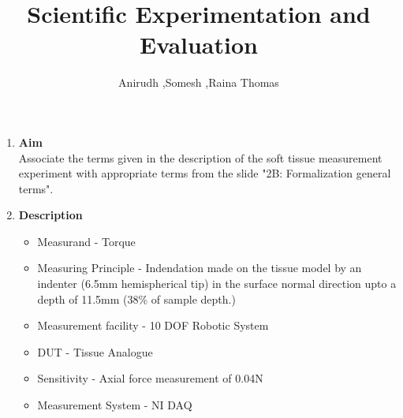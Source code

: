 \documentclass[10pt,a4paper]{article}
\author{Anirudh ,Somesh ,Raina Thomas}
\title{
	\textbf{Scientific Experimentation and Evaluation}
	}
\begin{document}
	

\Large
\begin{enumerate}[label=\Roman*]
\item
\Large{\textbf{Aim}}\\

Associate the terms given in the description of the soft tissue measurement experiment with appropriate terms from the slide "2B: Formalization general terms".
\vspace{0.3cm}
\item
\Large{\textbf{Description}}\\

\begin{itemize}
	\item	
	Measurand - Torque
	\item
	Measuring Principle - Indendation made on the tissue model by an indenter (6.5mm hemispherical tip) in the surface normal direction upto a depth of 11.5mm (38\% of sample depth.)
	\item
	Measurement facility - 10 DOF Robotic System
	\item
	DUT - Tissue Analogue
	\item
	Sensitivity - Axial force measurement of 0.04N
	\item
	Measurement System - NI DAQ
	
\end{itemize}


\end{enumerate}	
\end{document}
